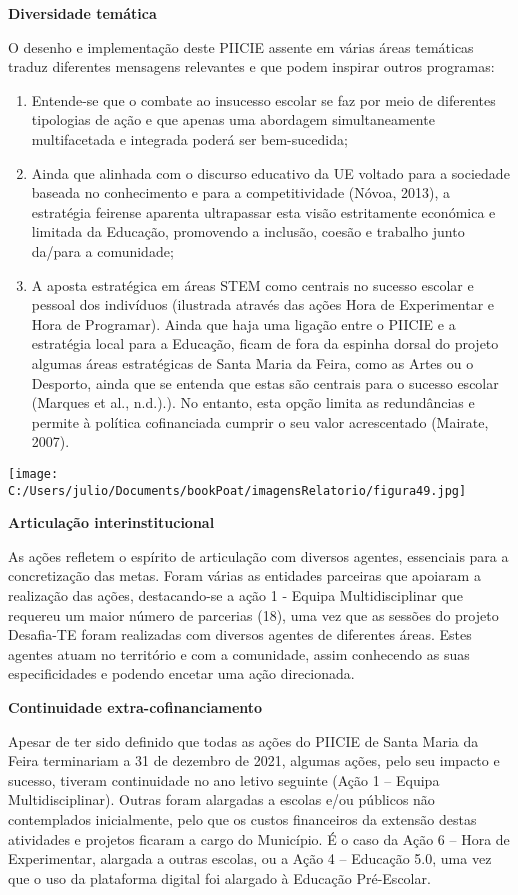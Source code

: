 \documentclass[
]{book}
\begin{document}
\textbf{Diversidade temática}

O desenho e implementação deste PIICIE assente em várias áreas temáticas traduz diferentes mensagens relevantes e que podem inspirar outros programas:

\begin{enumerate}
\def\labelenumi{\arabic{enumi}.}
\item
  Entende-se que o combate ao insucesso escolar se faz por meio de diferentes tipologias de ação e que apenas uma abordagem simultaneamente multifacetada e integrada poderá ser bem-sucedida;
\item
  Ainda que alinhada com o discurso educativo da UE voltado para a sociedade baseada no conhecimento e para a competitividade (Nóvoa, 2013), a estratégia feirense aparenta ultrapassar esta visão estritamente económica e limitada da Educação, promovendo a inclusão, coesão e trabalho junto da/para a comunidade;
\item
  A aposta estratégica em áreas STEM como centrais no sucesso escolar e pessoal dos indivíduos (ilustrada através das ações Hora de Experimentar e Hora de Programar).
  Ainda que haja uma ligação entre o PIICIE e a estratégia local para a Educação, ficam de fora da espinha dorsal do projeto algumas áreas estratégicas de Santa Maria da Feira, como as Artes ou o Desporto, ainda que se entenda que estas são centrais para o sucesso escolar (Marques et al., n.d.).). No entanto, esta opção limita as redundâncias e permite à política cofinanciada cumprir o seu valor acrescentado (Mairate, 2007).
\end{enumerate}

\texttt{[image: C:/Users/julio/Documents/bookPoat/imagensRelatorio/figura49.jpg]}

\textbf{Articulação interinstitucional}

As ações refletem o espírito de articulação com diversos agentes, essenciais para a concretização das metas. Foram várias as entidades parceiras que apoiaram a realização das ações, destacando-se a ação 1 - Equipa Multidisciplinar que requereu um maior número de parcerias (18), uma vez que as sessões do projeto Desafia-TE foram realizadas com diversos agentes de diferentes áreas. Estes agentes atuam no território e com a comunidade, assim conhecendo as suas especificidades e podendo encetar uma ação direcionada.

\textbf{Continuidade extra-cofinanciamento}

Apesar de ter sido definido que todas as ações do PIICIE de Santa Maria da Feira terminariam a 31 de dezembro de 2021, algumas ações, pelo seu impacto e sucesso, tiveram continuidade no ano letivo seguinte (Ação 1 -- Equipa Multidisciplinar). Outras foram alargadas a escolas e/ou públicos não contemplados inicialmente, pelo que os custos financeiros da extensão destas atividades e projetos ficaram a cargo do Município. É o caso da Ação 6 -- Hora de Experimentar, alargada a outras escolas, ou a Ação 4 -- Educação 5.0, uma vez que o uso da plataforma digital foi alargado à Educação Pré-Escolar.
\end{document}
